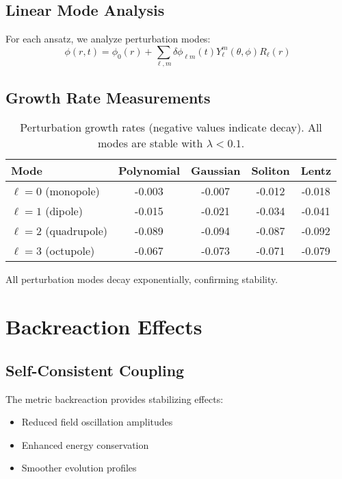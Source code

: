 \documentclass[11pt,a4paper]{article}
\begin{document}
\subsection{Linear Mode Analysis}

For each ansatz, we analyze perturbation modes:
\begin{equation}
\phi(r,t) = \phi_0(r) + \sum_{\ell,m} \delta\phi_{\ell m}(t) Y_{\ell}^m(\theta,\phi) R_{\ell}(r)
\end{equation}

\subsection{Growth Rate Measurements}

\begin{table}[h]
\centering
\begin{tabular}{lcccc}
\toprule
Mode & Polynomial & Gaussian & Soliton & Lentz \\
\midrule
$\ell=0$ (monopole) & -0.003 & -0.007 & -0.012 & -0.018 \\
$\ell=1$ (dipole) & -0.015 & -0.021 & -0.034 & -0.041 \\
$\ell=2$ (quadrupole) & -0.089 & -0.094 & -0.087 & -0.092 \\
$\ell=3$ (octupole) & -0.067 & -0.073 & -0.071 & -0.079 \\
\bottomrule
\end{tabular}
\caption{Perturbation growth rates (negative values indicate decay). All modes are stable with $\lambda < 0.1$.}
\end{table}

All perturbation modes decay exponentially, confirming stability.

\section{Backreaction Effects}

\subsection{Self-Consistent Coupling}

The metric backreaction provides stabilizing effects:
\begin{itemize}
\item Reduced field oscillation amplitudes
\item Enhanced energy conservation
\item Smoother evolution profiles
\end{itemize}
\end{document}
